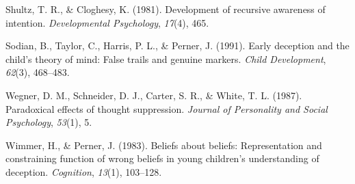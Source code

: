 \documentclass[10pt, letterpaper]{article}
\newenvironment{CSLReferences}%
  {}%
  {\par}
\begin{document}
\begin{CSLReferences}{1}{0}
\leavevmode{}%
Shultz, T. R., \& Cloghesy, K. (1981). Development of recursive
awareness of intention. \emph{Developmental Psychology}, \emph{17}(4),
465.

\leavevmode{}%
Sodian, B., Taylor, C., Harris, P. L., \& Perner, J. (1991). Early
deception and the child's theory of mind: False trails and genuine
markers. \emph{Child Development}, \emph{62}(3), 468--483.

\leavevmode{}%
Wegner, D. M., Schneider, D. J., Carter, S. R., \& White, T. L. (1987).
Paradoxical effects of thought suppression. \emph{Journal of Personality
and Social Psychology}, \emph{53}(1), 5.

\leavevmode{}%
Wimmer, H., \& Perner, J. (1983). Beliefs about beliefs: Representation
and constraining function of wrong beliefs in young children's
understanding of deception. \emph{Cognition}, \emph{13}(1), 103--128.

\end{CSLReferences}


\end{document}
